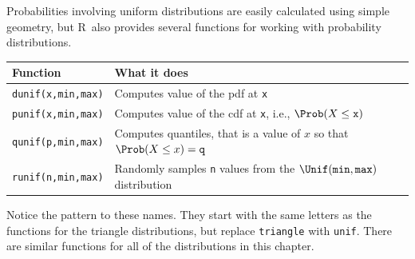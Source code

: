\documentclass[twoside]{book}\usepackage[]{graphicx}\usepackage[]{xcolor}
\def\R{{\sf R}}
\begin{document}
Probabilities involving uniform distributions are easily calculated using simple geometry,
but \R\ also provides several functions for working with probability distributions.

\begin{center}
\begin{tabular}{ll}
	\hline
	Function & What it does \\
	\hline
	\texttt{dunif(x,min,max)} & Computes value of the pdf at \texttt{x}
	\\
	\texttt{punif(x,min,max)} & Computes value of the cdf at \texttt{x}, i.e., 
	$\Prob(X \le \texttt{x})$
	\\
	\texttt{qunif(p,min,max)} & Computes quantiles, that is a value of $x$ so that 
								$\Prob(X \le x) = \texttt{q}$
    \\
	\texttt{runif(n,min,max)} & Randomly samples \texttt{n} values from the 
								$\Unif(\texttt{min}, \texttt{max})$ distribution
	\\
	\hline
\end{tabular}
\end{center}

Notice the pattern to these names.  They start with the same letters as 
the functions for the triangle distributions, but replace \texttt{triangle}
with \texttt{unif}.  There are similar functions for all of the distributions
in this chapter.
\end{document}
